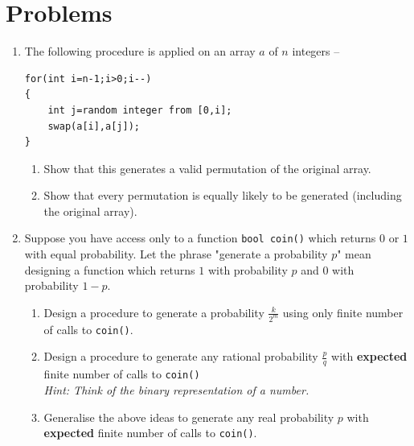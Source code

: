 \clearpage
\section{Problems}

\begin{enumerate}

\item[\textbf{1}]
The following procedure is applied on an array \(a\) of \(n\) integers --
\begin{verbatim}
for(int i=n-1;i>0;i--)
{
    int j=random integer from [0,i];
    swap(a[i],a[j]);
}
\end{verbatim}

\begin{enumerate}[label=\textbf{(\alph*)}]
\item Show that this generates a valid permutation of the original array.
\item Show that every permutation is equally likely to be generated (including the original array).
\end{enumerate}

\item[\textbf{2}]
Suppose you have access only to a function \texttt{bool coin()} which returns \(0\) or \(1\) 
with equal probability. Let the phrase "generate a probability $p$" mean designing a function 
which returns $1$ with probability $p$ and $0$ with probability $1-p$.

\begin{enumerate}[label=\textbf{(\alph*)}]
\item Design a procedure to generate a probability $\frac{k}{2^m}$ using only finite number of calls to \texttt{coin()}.
\item Design a procedure to generate any rational probability $\frac{p}{q}$ with \textbf{expected} 
finite number of calls to \texttt{coin()}\\
\textit{Hint: Think of the binary representation of a number.}
\item Generalise the above ideas to generate any real probability $p$ with \textbf{expected} 
finite number of calls to \texttt{coin()}.
\end{enumerate}

\end{enumerate}